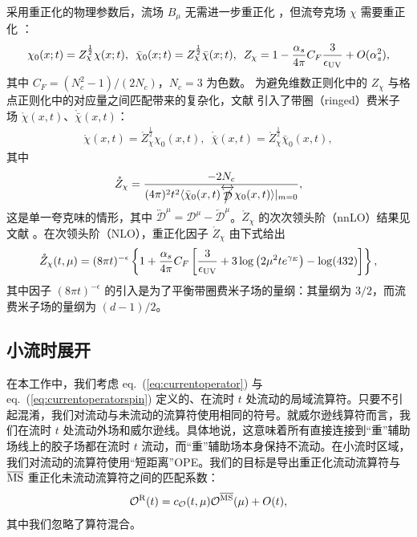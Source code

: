 采用重正化的物理参数后，流场 $B_{\mu}$ 无需进一步重正化 \cite{Luscher:2010iy,Luscher:2011bx}，但流夸克场 $\chi$ 需要重正化 \cite{Luscher:2013cpa}：
\begin{eqnarray}
\chi_{0}(x; t) = Z_{\chi}^{\frac{1}{2}} \chi(x; t), \, \, \, \bar{\chi}_0(x; t) = Z_{\chi}^{\frac{1}{2}} \bar{\chi}(x; t), \, \, \,  Z_{\chi} = 1- \frac{\alpha_s}{4\pi}C_F \frac{3}{\epsilon_{\rm UV}} + O(\alpha_s^2),
\end{eqnarray}
其中 $C_F = (N_c^2-1)/(2N_c)$，$N_c=3$ 为色数。
为避免维数正则化中的 $Z_{\chi}$ 与格点正则化中的对应量之间匹配带来的复杂化，文献 \cite{Makino:2014taa} 引入了带圈（ringed）费米子场 $\mathring{\chi}(x,t)$、$\mathring{\bar{\chi}}(x,t)$：
\begin{eqnarray}
\mathring{\chi}(x,t) = \mathring{Z}_{\chi}^{\frac{1}{2}}\chi_{0}(x,t),\, \,  \, \mathring{\bar{\chi}}(x,t) = \mathring{Z}_{\chi}^{\frac{1}{2}}\bar{\chi}_{0}(x,t),
\end{eqnarray}
其中
\begin{eqnarray}
 \mathring{Z}_{\chi}=\frac{-2N_c}{(4\pi)^2t^2
\langle \bar{\chi}_{0}(x,t)\overleftrightarrow{\slashed{\mathcal{D}}}\chi_{0}(x,t)\rangle|_{m=0}},
\end{eqnarray}
这是单一夸克味的情形，其中 $\overleftrightarrow{\mathcal{D}}^{\mu} = {\mathcal{D}}^{\mu}  - \overleftarrow{\mathcal{D}}^{\mu}$。$\mathring{Z}_{\chi}$ 的次次领头阶（nnLO）结果见文献 \cite{Artz:2019bpr}。在次领头阶（NLO），重正化因子 $\mathring{Z}_{\chi}$ 由下式给出 \cite{Makino:2014taa}
\begin{eqnarray}
\label{eq:ringedfermionren}
\mathring{Z}_{\chi}(t, \mu) = (8\pi t)^{-\epsilon}\left\{1+  \frac{\alpha_s}{4\pi}C_F\left[\frac{3}{\epsilon_{\rm UV}} + 3\log\left(2\mu^2 te^{\gamma_E}\right)-\log(432)\right] \right\},
\end{eqnarray}
其中因子 $(8\pi t)^{-\epsilon}$ 的引入是为了平衡带圈费米子场的量纲：其量纲为 $3/2$，而流费米子场的量纲为 $(d-1)/2$。




\subsection{小流时展开}
\label{subsec:smallflowexp}
在本工作中，我们考虑 eq.~(\ref{eq:currentoperator}) 与 eq.~(\ref{eq:currentoperatorspin}) 定义的、在流时 $t$ 处流动的局域流算符。只要不引起混淆，我们对流动与未流动的流算符使用相同的符号。就威尔逊线算符而言，我们在流时 $t$ 处流动外场和威尔逊线。具体地说，这意味着所有直接连接到``重''辅助场线上的胶子场都在流时 $t$ 流动，而``重''辅助场本身保持不流动。在小流时区域，我们对流动的流算符使用``短距离''OPE。我们的目标是导出重正化流动流算符与 $\overline{\rm MS}$ 重正化未流动流算符之间的匹配系数：
\begin{eqnarray}
\label{eq:smalltexpansion}
\mathcal{O}^{\rm R} (t)= c_{\mathcal{O}}(t, \mu)\mathcal{O}^{\overline{\rm MS}} (\mu) + O(t),
\end{eqnarray}
其中我们忽略了算符混合。



